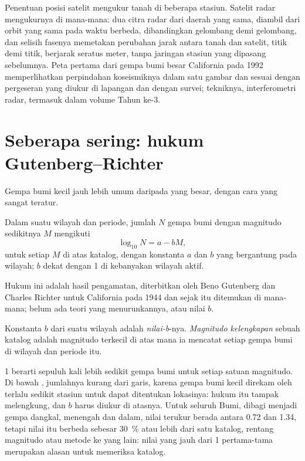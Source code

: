 Penentuan posisi satelit mengukur tanah di beberapa stasiun. Satelit radar mengukurnya di mana-mana: dua citra radar dari daerah yang sama, diambil dari orbit yang sama pada waktu berbeda, dibandingkan gelombang demi gelombang, dan selisih fasenya memetakan perubahan jarak antara tanah dan satelit, titik demi titik, berjarak seratus meter, tanpa jaringan stasiun yang dipasang sebelumnya. Peta pertama dari gempa bumi besar California pada 1992 memperlihatkan perpindahan koseismiknya dalam satu gambar dan sesuai dengan pergeseran yang diukur di lapangan dan dengan survei; tekniknya, interferometri radar, termasuk dalam volume Tahun ke-3.

\section{Seberapa sering: hukum Gutenberg--Richter}\label{sec:b1:earthquake-source:gr}

Gempa bumi kecil jauh lebih umum daripada yang besar, dengan cara yang sangat teratur.

\begin{proposition}\label{prop:b1:earthquake-source:gutenberg-richter}
Dalam suatu wilayah dan periode, jumlah $N$ gempa bumi dengan magnitudo sedikitnya
$M$ mengikuti
\[
  \log_{10} N = a - bM ,
\]
untuk setiap $M$ di atas  katalog, dengan konstanta $a$ dan $b$ yang bergantung pada wilayah; $b$ dekat dengan 1 di kebanyakan wilayah aktif.
\end{proposition}
\admitted

Hukum ini adalah hasil pengamatan, diterbitkan oleh Beno Gutenberg dan Charles Richter untuk California pada 1944 dan sejak itu ditemukan di mana-mana; belum ada teori yang menurunkannya, atau nilai $b$.

\begin{definition}\label{def:b1:earthquake-source:b-value}
Konstanta $b$ dari  suatu wilayah adalah \emph{nilai-b}-nya. \emph{Magnitudo kelengkapan} sebuah katalog adalah magnitudo terkecil di atas mana ia mencatat setiap gempa bumi di wilayah dan periode itu.
\end{definition}

 1 berarti sepuluh kali lebih sedikit gempa bumi untuk setiap satuan magnitudo. Di bawah , jumlahnya kurang dari garis, karena gempa bumi kecil direkam oleh terlalu sedikit stasiun untuk dapat ditentukan lokasinya: hukum itu tampak melengkung, dan $b$ harus diukur di atasnya. Untuk seluruh Bumi, dibagi menjadi gempa dangkal, menengah dan dalam, nilai terukur berada antara 0.72 dan 1.34, tetapi nilai itu berbeda sebesar \qty{30}{\percent} atau lebih dari satu katalog, rentang magnitudo atau metode ke yang lain: nilai yang jauh dari 1 pertama-tama merupakan alasan untuk memeriksa katalog.

